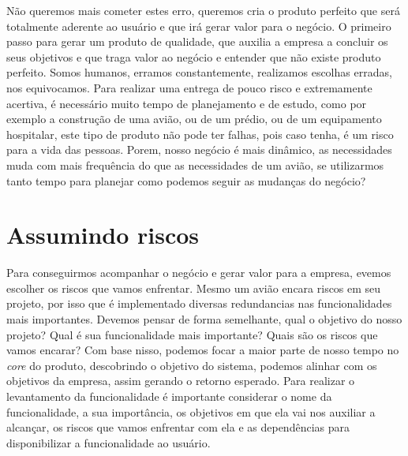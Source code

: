     Não queremos mais cometer estes erro, queremos cria o produto perfeito que
    será totalmente aderente ao usuário e que irá gerar valor para o negócio. \newline
    O primeiro passo para gerar um produto de qualidade, que auxilia a empresa a
    concluir os seus objetivos e que traga valor ao negócio e entender que não
    existe produto perfeito. Somos humanos, erramos constantemente, realizamos
    escolhas erradas, nos equivocamos. Para realizar uma entrega de pouco risco
    e extremamente acertiva, é necessário muito tempo de planejamento e de estudo,
    como por exemplo a construção de uma avião, ou de um prédio, ou de um
    equipamento hospitalar, este tipo de produto não pode ter falhas, pois caso
    tenha, é um risco para a vida das pessoas. Porem, nosso negócio é mais
    dinâmico, as necessidades muda com mais frequência do que as necessidades de
    um avião, se utilizarmos tanto tempo para planejar como podemos seguir as
    mudanças do negócio?

    \section{Assumindo riscos}
      Para conseguirmos acompanhar o negócio e gerar valor para a empresa, evemos
      escolher os riscos que vamos enfrentar. Mesmo um avião encara riscos em seu
      projeto, por isso que é implementado diversas redundancias nas funcionalidades
      mais importantes. Devemos pensar de forma semelhante, qual o objetivo do nosso
      projeto? Qual é sua funcionalidade mais importante? Quais são os riscos que
      vamos encarar? \newline
      Com base nisso, podemos focar a maior parte de nosso tempo no \textit{core}
      do produto, descobrindo o objetivo do sistema, podemos alinhar com os objetivos
      da empresa, assim gerando o retorno esperado. Para realizar o levantamento
      da funcionalidade é importante considerar o nome da funcionalidade, a sua
      importância, os objetivos em que ela vai nos auxiliar a alcançar, os riscos
      que vamos enfrentar com ela e as dependências para disponibilizar a
      funcionalidade ao usuário.

